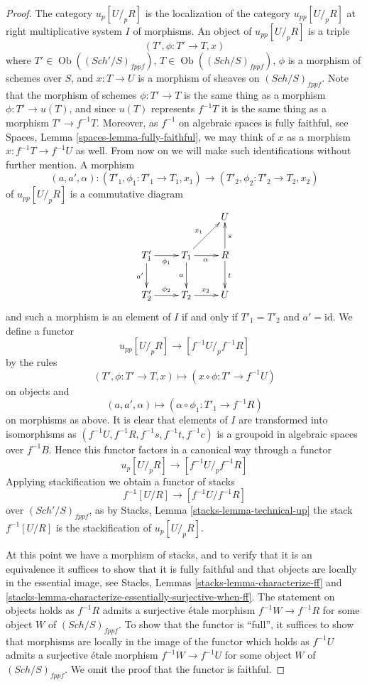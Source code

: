 \documentclass{stacks-project}
\theoremstyle{plain}
\theoremstyle{definition}
\theoremstyle{remark}
\numberwithin{equation}{subsection}
\def\Sch{\mathit{Sch}}
\def\Ob{\mathop{\mathrm{Ob}}\nolimits}
\begin{document}
\begin{proof}
\medskip\noindent
The category $u_p[U/_{\!p}R]$ is the localization of the category
$u_{pp}[U/_{\!p}R]$ at right multiplicative system $I$ of morphisms.
An object of $u_{pp}[U/_{\!p}R]$ is a triple
$$
(T', \phi : T' \to T, x)
$$
where
$T' \in \Ob((\Sch'/S)_{fppf})$,
$T \in \Ob((\Sch/S)_{fppf})$, $\phi$ is a morphism of schemes
over $S$, and $x : T \to U$ is a morphism of sheaves on
$(\Sch/S)_{fppf}$. Note that the morphism of
schemes $\phi : T' \to T$ is the same thing as a morphism
$\phi : T' \to u(T)$, and since $u(T)$ represents $f^{-1}T$ it is the
same thing as a morphism $T' \to f^{-1}T$. Moreover, as $f^{-1}$ on
algebraic spaces is fully faithful, see
Spaces, Lemma \ref{spaces-lemma-fully-faithful},
we may think of $x$ as a morphism $x : f^{-1}T \to f^{-1}U$ as well.
From now on we will make such identifications without further mention.
A morphism
$$
(a, a', \alpha) :
(T'_1, \phi_1 : T'_1 \to T_1, x_1)
\longrightarrow
(T'_2, \phi_2 : T'_2 \to T_2, x_2)
$$
of $u_{pp}[U/_{\!p}R]$ is a commutative diagram
$$
\xymatrix{
& & U \\
T'_1 \ar[d]_{a'} \ar[r]_{\phi_1} &
T_1 \ar[d]_a \ar[ru]^{x_1} \ar[r]_\alpha &
R \ar[d]^t \ar[u]_s \\
T'_2 \ar[r]^{\phi_2} &
T_2 \ar[r]^{x_2} &
U
}
$$
and such a morphism is an element of $I$ if and only if
$T'_1 = T'_2$ and $a' = \text{id}$.
We define a functor
$$
u_{pp}[U/_{\!p}R] \longrightarrow [f^{-1}U/_{\!p}f^{-1}R]
$$
by the rules
$$
(T', \phi : T' \to T, x) \longmapsto (x \circ \phi : T' \to f^{-1}U)
$$
on objects and
$$
(a, a', \alpha) \longmapsto (\alpha \circ \phi_1 : T'_1 \to f^{-1}R)
$$
on morphisms as above. It is clear that elements of $I$ are transformed
into isomorphisms as $(f^{-1}U, f^{-1}R, f^{-1}s, f^{-1}t, f^{-1}c)$
is a groupoid in algebraic spaces over $f^{-1}B$. Hence this functor
factors in a canonical way through a functor
$$
u_p[U/_{\!p}R] \longrightarrow [f^{-1}U/_{\!p}f^{-1}R]
$$
Applying stackification we obtain a functor of stacks
$$
f^{-1}[U/R] \longrightarrow [f^{-1}U/f^{-1}R]
$$
over $(\Sch'/S)_{fppf}$, as by
Stacks, Lemma \ref{stacks-lemma-technical-up}
the stack $f^{-1}[U/R]$ is the stackification of $u_p[U/_{\!p}R]$.

\medskip\noindent
At this point we have a morphism of stacks, and to verify that it is an
equivalence it suffices to show that it is fully faithful and that
objects are locally in the essential image, see
Stacks, Lemmas \ref{stacks-lemma-characterize-ff} and
\ref{stacks-lemma-characterize-essentially-surjective-when-ff}.
The statement on objects holds as $f^{-1}R$ admits a surjective \'etale
morphism $f^{-1}W \to f^{-1}R$ for some object $W$ of
$(\Sch/S)_{fppf}$. To show that the functor is ``full'', it
suffices to show that morphisms are locally in the image
of the functor which holds as $f^{-1}U$ admits a surjective \'etale morphism
$f^{-1}W \to f^{-1}U$ for some object $W$ of $(\Sch/S)_{fppf}$.
We omit the proof that the functor is faithful.
\end{proof}
\end{document}
